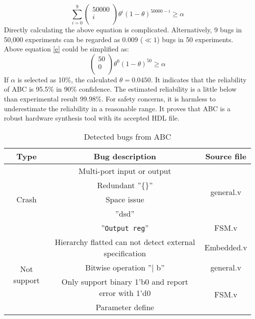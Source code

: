 \begin{equation}
\label{e}
\sum_{i=0}^{9} 
       \begin{pmatrix}
       50000\\
       i\\
       \end{pmatrix}
       \theta^{i}(1-\theta)^{50000-i}\ge \alpha
\end{equation}
Directly calculating the above equation is complicated. Alternatively, 9 bugs in 50,000 experiments can be regarded as 0.009 ($\ll1$) bugs in 50 experiments. Above equation \ref{e} could be simplified as:
\begin{equation}
       \begin{pmatrix}
       50\\
       0\\
       \end{pmatrix}
       \theta^{0}(1-\theta)^{50}\ge \alpha
\end{equation}
If $\alpha$ is selected as 10\%, the calculated $\theta=0.0450$. It indicates that the reliability of ABC is 95.5\% in 90\% confidence. The estimated reliability is a little below than experimental result 99.98\%. For safety concerns, it is harmless to underestimate the reliability in a reasonable range. It proves that ABC is a robust hardware synthesis tool with its accepted HDL file. 
\begin{table}[htb]
    \centering
    \begin{tabular}{c|c|c}
        \hline
       \textbf{Type} & \textbf{Bug description} & \textbf{Source file}\\
        \hline
     \multirow{5}{*}{Crash}& Multi-port input or output & \multirow{4}{*}{general.v}\\
     \cline{2-2}
     & Redundant ''\{\}'' & \\
     \cline{2-2}
     &Space issue & \\
     \cline{2-2}
     &''dsd'' & \\
     \cline{2-3}
     &''\texttt{Output reg}'' & FSM.v\\
     \hline
     \multirow{4}{*}{Not support} & Hierarchy flatted can not detect external specification & Embedded.v\\
     \cline{2-3}
     & Bitwise operation ''| b''&general.v\\
     \cline{2-3}
     & Only support binary 1’b0 and report error with 1’d0&\multirow{2}{*}{FSM.v}\\
     \cline{2-2}
     & Parameter define&\\
     \hline
\end{tabular}
    \caption{\footnotesize Detected bugs from ABC}
    \label{tab:bugs}
\end{table}


